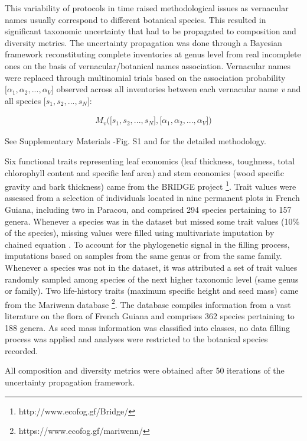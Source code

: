 \documentclass[fleqn,10pt]{ArtEcoFoG} %
\begin{document}
This variability of protocols in time raised methodological issues as
vernacular names usually correspond to different botanical species. This
resulted in significant taxonomic uncertainty that had to be propagated
to composition and diversity metrics. The uncertainty propagation was
done through a Bayesian framework reconstituting complete inventories at
genus level from real incomplete ones on the basis of
vernacular/botanical names association. Vernacular names were replaced
through multinomial trials based on the association probability
\(\big[\alpha_1, \alpha_2,..., \alpha_V\big]\) observed across all
inventories between each vernacular name \emph{v} and all species
\(\big[s_1, s_2,..., s_N\big]\):

\begin{align}
M_v\Big(\big[s_1, s_2,..., s_N\big],\big[\alpha_1, \alpha_2,..., \alpha_V\big]\Big) \nonumber
\end{align}

See Supplementary Materials -Fig. S1 and \citet{Aubry-Kientz2013} for
the detailed methodology.

Six functional traits representing leaf economics (leaf thickness,
toughness, total chlorophyll content and specific leaf area) and stem
economics (wood specific gravity and bark thickness) came from the
BRIDGE project \footnote{http://www.ecofog.gf/Bridge/}. Trait values
were assessed from a selection of individuals located in nine permanent
plots in French Guiana, including two in Paracou, and comprised 294
species pertaining to 157 genera. Whenever a species was in the dataset
but missed some trait values (10\% of the species), missing values were
filled using multivariate imputation by chained equation
\citep{Mice2011}. To account for the phylogenetic signal in the filling
process, imputations based on samples from the same genus or from the
same family. Whenever a species was not in the dataset, it was
attributed a set of trait values randomly sampled among species of the
next higher taxonomic level (same genus or family). Two life-history
traits (maximum specific height and seed mass) came from the Mariwenn
database \footnote{https://www.ecofog.gf/mariwenn/}. The database
compiles information from a vast literature on the flora of French
Guiana \citep{Ollivier2007} and comprises 362 species pertaining to 188
genera. As seed mass information was classified into classes, no data
filling process was applied and analyses were restricted to the
botanical species recorded.

All composition and diversity metrics were obtained after 50 iterations
of the uncertainty propagation framework.
\end{document}
